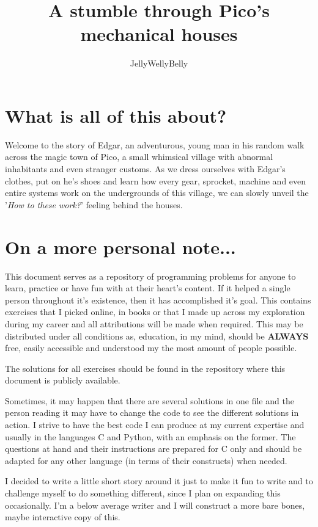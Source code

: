 \documentclass[table]{exam}
\title{A stumble through Pico's mechanical houses}
\author{JellyWellyBelly}
\date{}
\begin{document}
\maketitle


\section*{What is all of this about?}

Welcome to the story of Edgar, an adventurous, young man in his random walk across the magic town of Pico, a small whimsical village with abnormal inhabitants and even stranger customs. As we dress ourselves with Edgar's clothes, put on he's shoes and learn how every gear, sprocket, machine and even entire systems work on the undergrounds of this village, we can slowly unveil the '\textit{How to these work?}' feeling behind the houses.

\section*{On a more personal note...}

This document serves as a repository of programming problems for anyone to learn, practice or have fun with at their heart's content. If it helped a single person throughout it's existence, then it has accomplished it's goal. This contains exercises that I picked online, in books or that I made up across my exploration during my career and all attributions will be made when required. This may be distributed under all conditions as, education, in my mind, should be \textbf{ALWAYS} free, easily accessible and understood my the most amount of people possible.

The solutions for all exercises should be found in the repository where this document is publicly available. 

Sometimes, it may happen that there are several solutions in one file and the person reading it may have to change the code to see the different solutions in action. I strive to have the best code I can produce at my current expertise and usually in the languages C and Python, with an emphasis on the former. The questions at hand and their instructions are prepared for C only and should be adapted for any other language (in terms of their constructs) when needed.

I decided to write a little short story around it just to make it fun to write and to challenge myself to do something different, since I plan on expanding this occasionally. I'm a below average writer and I will construct a more bare bones, maybe interactive copy of this.
\end{document}
